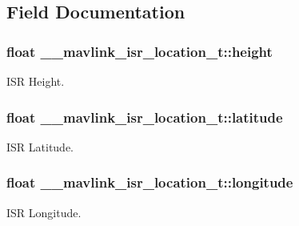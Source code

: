 \subsection{Field Documentation}
\hypertarget{struct____mavlink__isr__location__t_ab250cc8e7f75a35eb90ea414ad32e45f}{
\subsubsection[{height}]{\setlength{\rightskip}{0pt plus 5cm}float \+\_\+\+\_\+mavlink\+\_\+isr\+\_\+location\+\_\+t\+::height}}\label{struct____mavlink__isr__location__t_ab250cc8e7f75a35eb90ea414ad32e45f}


I\+S\+R Height. 

\hypertarget{struct____mavlink__isr__location__t_ad8dad07c3383d1ca918a8a060a1ff1bb}{
\subsubsection[{latitude}]{\setlength{\rightskip}{0pt plus 5cm}float \+\_\+\+\_\+mavlink\+\_\+isr\+\_\+location\+\_\+t\+::latitude}}\label{struct____mavlink__isr__location__t_ad8dad07c3383d1ca918a8a060a1ff1bb}


I\+S\+R Latitude. 

\hypertarget{struct____mavlink__isr__location__t_aaac5099bf28d3f328e0e319ec242b312}{
\subsubsection[{longitude}]{\setlength{\rightskip}{0pt plus 5cm}float \+\_\+\+\_\+mavlink\+\_\+isr\+\_\+location\+\_\+t\+::longitude}}\label{struct____mavlink__isr__location__t_aaac5099bf28d3f328e0e319ec242b312}


I\+S\+R Longitude. 

